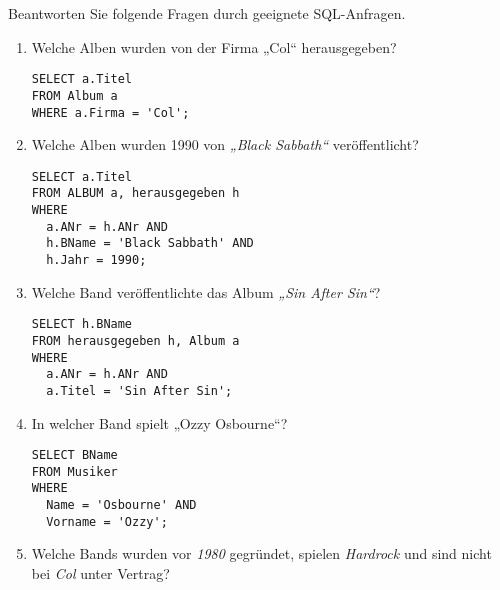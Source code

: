 \documentclass{lehramt-informatik-aufgabe}
\begin{document}
\noindent
Beantworten Sie folgende Fragen durch geeignete SQL-Anfragen.

\begin{enumerate}


\item Welche Alben wurden von der Firma „Col“ herausgegeben?

\begin{antwort}
\begin{verbatim}
SELECT a.Titel
FROM Album a
WHERE a.Firma = 'Col';
\end{verbatim}
\end{antwort}


\item Welche Alben wurden 1990 von \emph{„Black Sabbath“}
veröffentlicht?

\begin{antwort}
\begin{verbatim}
SELECT a.Titel
FROM ALBUM a, herausgegeben h
WHERE
  a.ANr = h.ANr AND
  h.BName = 'Black Sabbath' AND
  h.Jahr = 1990;
\end{verbatim}
\end{antwort}


\item Welche Band veröffentlichte das Album \emph{„Sin After Sin“}?

\begin{antwort}
\begin{verbatim}
SELECT h.BName
FROM herausgegeben h, Album a
WHERE
  a.ANr = h.ANr AND
  a.Titel = 'Sin After Sin';
\end{verbatim}
\end{antwort}


\item In welcher Band spielt „Ozzy Osbourne“?

\begin{antwort}
\begin{verbatim}
SELECT BName
FROM Musiker
WHERE
  Name = 'Osbourne' AND
  Vorname = 'Ozzy';
\end{verbatim}
\end{antwort}


\item Welche Bands wurden vor \emph{1980} gegründet, spielen
\emph{Hardrock} und sind nicht bei \emph{Col} unter Vertrag?


\end{enumerate}
\end{document}
